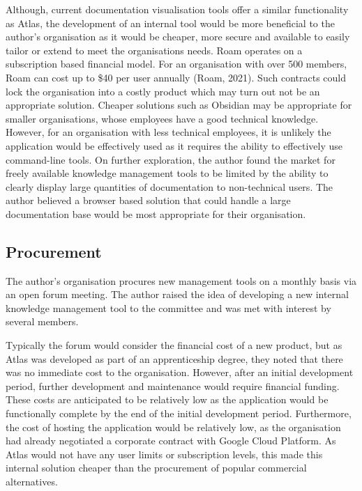 \documentclass{article}
\begin{document}
Although, current documentation visualisation tools offer a similar functionality as Atlas, the development of an internal tool would be more beneficial to the author's organisation as it would be cheaper, more secure and available to easily tailor or extend to meet the organisations needs. Roam operates on a subscription based financial model. For an organisation with over 500 members, Roam can cost up to \$40 per user annually (Roam, 2021). Such contracts could lock the organisation into a costly product which may turn out not be an appropriate solution. Cheaper solutions such as Obsidian may be appropriate for smaller organisations, whose employees have a good technical knowledge. However, for an organisation with less technical employees, it is unlikely the application would be effectively used as it requires the ability to effectively use command-line tools. On further exploration, the author found the market for freely available knowledge management tools to be limited by the ability to clearly display large quantities of documentation to non-technical users. The author believed a browser based solution that could handle a large documentation base would be most appropriate for their organisation.

\subsection{Procurement}

The author's organisation procures new management tools on a monthly basis via an open forum meeting. The author raised the idea of developing a new internal knowledge management tool to the committee and was met with interest by several members. 

Typically the forum would consider the financial cost of a new product, but as Atlas was developed as part of an apprenticeship degree, they noted that there was no immediate cost to the organisation. However, after an initial development period, further development and maintenance would require financial funding. These costs are anticipated to be relatively low as the application would be functionally complete by the end of the initial development period. Furthermore, the cost of hosting the application would be relatively low, as the organisation had already negotiated a corporate contract with Google Cloud Platform. As Atlas would not have any user limits or subscription levels, this made this internal solution cheaper than the procurement of popular commercial alternatives.
\end{document}
